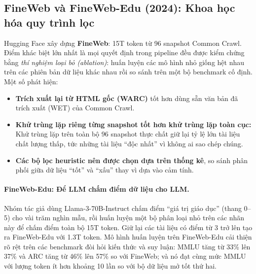 \subsection{FineWeb và FineWeb-Edu (2024): Khoa học hóa quy trình lọc}
\label{ssec:fineweb}
Hugging Face \cite{penedo2024fineweb} xây dựng \textbf{FineWeb}: 15T token từ 96 snapshot Common Crawl. Điểm khác biệt lớn nhất là mọi quyết định trong pipeline đều được kiểm chứng bằng \emph{thí nghiệm loại bỏ (ablation)}: huấn luyện các mô hình nhỏ giống hệt nhau trên các phiên bản dữ liệu khác nhau rồi so sánh trên một bộ benchmark cố định. Một số phát hiện:
\begin{itemize}
	\item \textbf{Trích xuất lại từ HTML gốc (WARC)} tốt hơn dùng sẵn văn bản đã trích xuất (WET) của Common Crawl.
	\item \textbf{Khử trùng lặp riêng từng snapshot tốt hơn khử trùng lặp toàn cục:} Khử trùng lặp trên toàn bộ 96 snapshot thực chất giữ lại tỷ lệ lớn tài liệu chất lượng thấp, tức những tài liệu “độc nhất” vì không ai sao chép chúng.
	\item \textbf{Các bộ lọc heuristic nên được chọn dựa trên thống kê}, so sánh phân phối giữa dữ liệu “tốt” và “xấu” thay vì dựa vào cảm tính.
\end{itemize}

\paragraph{FineWeb-Edu: Để LLM chấm điểm dữ liệu cho LLM.}
Nhóm tác giả dùng Llama-3-70B-Instruct chấm điểm “giá trị giáo dục” (thang 0--5) cho vài trăm nghìn mẫu, rồi huấn luyện một bộ phân loại nhỏ trên các nhãn này để chấm điểm toàn bộ 15T token. Giữ lại các tài liệu có điểm từ 3 trở lên tạo ra FineWeb-Edu với 1.3T token. Mô hình huấn luyện trên FineWeb-Edu cải thiện rõ rệt trên các benchmark đòi hỏi kiến thức và suy luận: MMLU tăng từ 33\% lên 37\% và ARC tăng từ 46\% lên 57\% so với FineWeb; và nó đạt cùng mức MMLU với lượng token ít hơn khoảng 10 lần so với bộ dữ liệu mở tốt thứ hai.

\begin{center}
\label{fig:fineweb_edu}
\end{center}


